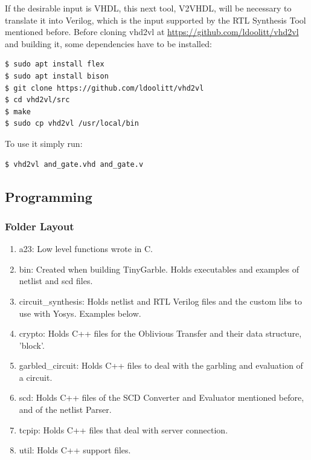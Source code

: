 \begin{refsection}
If the desirable input is VHDL, this next tool, V2VHDL, will be necessary to translate it into Verilog, which is the input supported by the RTL Synthesis Tool mentioned before.
Before cloning vhd2vl at \url{https://github.com/ldoolitt/vhd2vl} and building it, some dependencies have to be installed:

\begin{lstlisting}[caption={Installation of VHD2VL}, language=bash, captionpos=b]
$ sudo apt install flex
$ sudo apt install bison
$ git clone https://github.com/ldoolitt/vhd2vl
$ cd vhd2vl/src
$ make
$ sudo cp vhd2vl /usr/local/bin
\end{lstlisting}

To use it simply run:

\begin{lstlisting}[caption={Translation of VHDL file into Verilog}, language=bash, captionpos=b]
$ vhd2vl and_gate.vhd and_gate.v	
\end{lstlisting}

\newpage

\subsection{Programming}

\subsubsection{Folder Layout}

\begin{enumerate}
\item a23: Low level functions wrote in C.
\item bin: Created when building TinyGarble. Holds executables and examples of netlist and scd files.
\item circuit\_synthesis: Holds netlist and RTL Verilog files and the custom libs to use with Yosys. Examples below.
\item crypto: Holds C++ files for the Oblivious Transfer and their data structure, 'block'.
\item garbled\_circuit: Holds C++ files to deal with the garbling and evaluation of a circuit.
\item scd:  Holds C++ files of the SCD Converter and Evaluator mentioned before, and of the netlist Parser.
\item tcpip: Holds C++ files that deal with server connection.
\item util: Holds C++ support files.
\end{enumerate}


\end{refsection}
